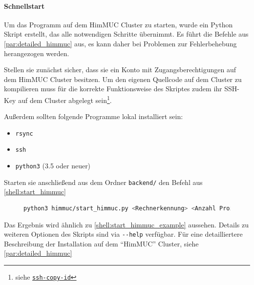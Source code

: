 \paragraph{Schnellstart}

Um das Programm auf dem HimMUC Cluster zu starten, wurde ein
Python Skript erstellt, das alle notwendigen Schritte übernimmt.
Es führt die Befehle aus \autoref{par:detailed_himmuc} aus, es kann daher bei Problemen zur Fehlerbehebung herangezogen werden.

Stellen sie zunächst sicher, dass sie ein Konto mit Zugangsberechtigungen auf dem HimMUC Cluster besitzen.
Um den eigenen Quellcode auf dem Cluster zu kompilieren muss für die korrekte Funktionsweise des Skriptes zudem
ihr SSH-Key auf dem Cluster abgelegt sein\footnote{siehe \href{https://www.ssh.com/ssh/copy-id}{\texttt{ssh-copy-id}}}.

Außerdem sollten folgende Programme lokal installiert sein:
\begin{itemize}
	\item \verb|rsync|
	\item \verb|ssh|
	\item \verb|python3| (3.5 oder neuer)
\end{itemize}

Starten sie anschließend aus dem Ordner \verb|backend/| den Befehl aus \autoref{shell:start_himmuc}

\begin{figure}[h!]
	\begin{lstlisting}[language=bash, caption={Start der Entwicklungsumbegung auf dem HimMUC}, label={shell:start_himmuc}]
python3 himmuc/start_himmuc.py <Rechnerkennung> <Anzahl Prozesse> <Anzahl Rechenknoten> 
    \end{lstlisting}
\end{figure}

Das Ergebnis wird ähnlich zu \autoref{shell:start_himmuc_example} aussehen.
Details zu weiteren Optionen des Skripts sind via \verb|--help| verfügbar.
Für eine detailliertere Beschreibung der Installation auf dem \enquote{HimMUC} Cluster,
siehe \autoref{par:detailed_himmuc}

